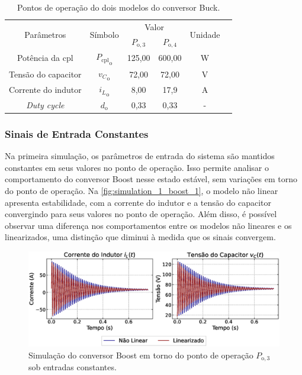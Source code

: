 \vspace{8pt}
\begin{table}[H]
  \centering
  \setlength{\tabcolsep}{10pt}
  \begin{tabular}{cccccc}
    \toprule
    \multirow{2}{*}{\centering Parâmetros} & \multirow{2}{*}{\centering Símbolo} & \multicolumn{2}{c}{\centering Valor} & \multirow{2}{*}{\centering Unidade} \\
    \cmidrule{3-4}
     &  & $P_{\mathrm{o}, 3}$ & $P_{\mathrm{o}, 4}$ &  \\
    \midrule
    Potência da \acrshort{cpl} & ${P_{\mathrm{cpl}}}_{\mathrm{o}}$ & 125,00  & 600,00 & W \\
    Tensão do capacitor & ${v_C}_{\mathrm{o}}$ & 72,00 & 72,00  & V \\
    Corrente do indutor & ${i_L}_{\mathrm{o}}$ & 8,00 & 17,9 & A \\
    \textit{Duty cycle} & $d_{\mathrm{o}}$ & 0,33 & 0,33 & - \\  
    \bottomrule
  \end{tabular}
  \caption{Pontos de operação do dois modelos do conversor Buck.}
  \label{table:op_parameters_boost}
\end{table}

\subsubsection{Sinais de Entrada Constantes}

Na primeira simulação, os parâmetros de entrada do sistema são mantidos constantes em seus valores no ponto de operação. Isso permite analisar o comportamento do conversor Boost nesse estado estável, sem variações em torno do ponto de operação. Na \autoref{fig:simulation_1_boost_1}, o modelo não linear apresenta estabilidade, com a corrente do indutor e a tensão do capacitor convergindo para seus valores no ponto de operação. Além disso, é possível observar uma diferença nos comportamentos entre os modelos não lineares e os linearizados, uma distinção que diminui à medida que os sinais convergem.

\begin{figure}[H]
  \centering
  \captionsetup{justification=centering}
  \includegraphics[width=1.\textwidth]{figuras/boost/sim1/op1/result.eps}
  \caption{Simulação do conversor Boost em torno do ponto de operação $P_{\mathrm{o}, 3}$ sob entradas constantes.}
  \label{fig:simulation_1_boost_1}
\end{figure}

